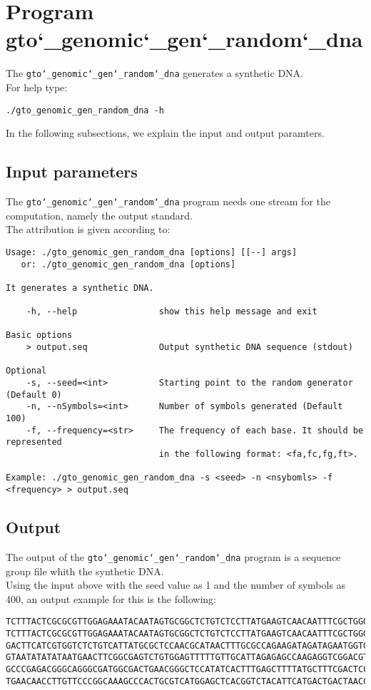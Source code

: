 \section{Program gto\char`_genomic\char`_gen\char`_random\char`_dna}
The \texttt{gto\char`_genomic\char`_gen\char`_random\char`_dna} generates a synthetic DNA.\\
For help type:
\begin{lstlisting}
./gto_genomic_gen_random_dna -h
\end{lstlisting}
In the following subsections, we explain the input and output paramters.

\subsection*{Input parameters}

The \texttt{gto\char`_genomic\char`_gen\char`_random\char`_dna} program needs one stream for the computation, namely the output standard.\\
The attribution is given according to:
\begin{lstlisting}
Usage: ./gto_genomic_gen_random_dna [options] [[--] args]
   or: ./gto_genomic_gen_random_dna [options]

It generates a synthetic DNA.

    -h, --help                show this help message and exit

Basic options
    > output.seq              Output synthetic DNA sequence (stdout)

Optional
    -s, --seed=<int>          Starting point to the random generator (Default 0)
    -n, --nSymbols=<int>      Number of symbols generated (Default 100)
    -f, --frequency=<str>     The frequency of each base. It should be represented 
    						  in the following format: <fa,fc,fg,ft>.

Example: ./gto_genomic_gen_random_dna -s <seed> -n <nsybomls> -f <frequency> > output.seq
\end{lstlisting}

\subsection*{Output}
The output of the \texttt{gto\char`_genomic\char`_gen\char`_random\char`_dna} program is a sequence group file whith the synthetic DNA.\\
Using the input above with the seed value as 1 and the number of symbols as 400, an output example for this is the following:
\begin{lstlisting}
TCTTTACTCGCGCGTTGGAGAAATACAATAGTGCGGCTCTGTCTCCTTATGAAGTCAACAATTTCGCTGGGACTTGCGGC
TCTTTACTCGCGCGTTGGAGAAATACAATAGTGCGGCTCTGTCTCCTTATGAAGTCAACAATTTCGCTGGGACTTGCGGC
GACTTCATCGTGGTCTCTGTCATTATGCGCTCCAACGCATAACTTTGCGCCAGAAGATAGATAGAATGGTGTAAGAAACT
GTAATATATATAATGAACTTCGGCGAGTCTGTGGAGTTTTTGTTGCATTAGAGAGCCAAGAGGTCGGACGTCCTCACGTA
GCCCGAGACGGGCAGGGCGATGGCGACTGAACGGGCTCCATATCACTTTGAGCTTTTATGCTTTCGACTCCTCCAGGAGC
TGAACAACCTTGTTCCCGGCAAAGCCCACTGCGTCATGGAGCTCACGGTCTACATTCATGACTGACTAACCGTAAACTGC
\end{lstlisting}
